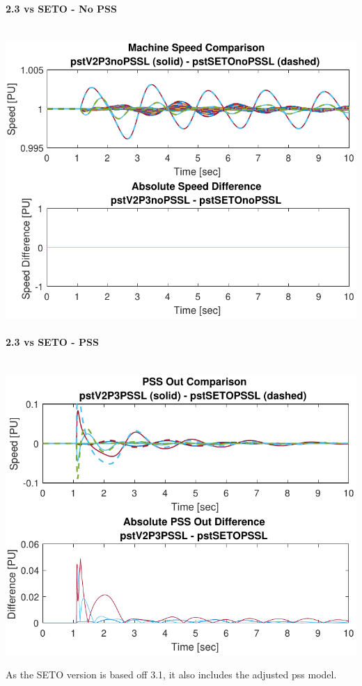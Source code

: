 \documentclass[12pt]{article}
\begin{document}
\begin{landscape}
\begin{multicols}{3}
\vfill\null
\columnbreak

\paragraph{2.3 vs SETO - No PSS} \ \\

\includegraphics[width=\linewidth]{pstV2P3noPSSLpstSETOnoPSSL}

\paragraph{2.3 vs SETO - PSS} \ \\
\includegraphics[width=\linewidth]{pstV2P3PSSLpstSETOPSSL}

As the SETO version is based off 3.1, it also includes the adjusted pss model.

\vfill\null
\end{multicols}


\end{landscape}
\end{document}
